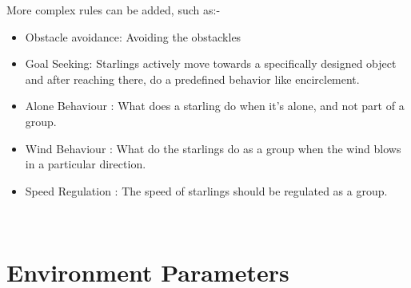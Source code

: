 \documentclass[12pt]{report}
\begin{document}
More complex rules can be added, such as:-

\begin{itemize}
  \item Obstacle avoidance: Avoiding the obstackles
  \item Goal Seeking: Starlings actively move towards a specifically designed object and after reaching there, do a predefined behavior like encirclement.
  \item Alone Behaviour : What does a starling do when it's alone, and not part of a group.
  \item Wind Behaviour : What do the starlings do as a group when the wind blows in a particular direction.
  \item Speed Regulation : The speed of starlings should be regulated as a group.
\end{itemize}

\\

\chapter{Environment Parameters}
\end{document}
